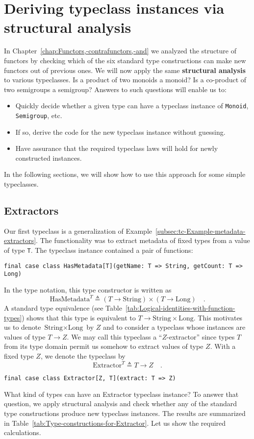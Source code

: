 \section{Deriving typeclass instances via structural analysis}

In Chapter~\ref{chap:Functors,-contrafunctors,-and} we analyzed
the structure of functors by checking which of the six standard type
constructions can make new functors out of previous ones. We will
now apply the same \textbf{structural
analysis} to various typeclasses. Is a product of two monoids a monoid?
Is a co-product of two semigroups a semigroup? Answers to such questions
will enable us to:
\begin{itemize}
\item Quickly decide whether a given type can have a typeclass instance
of \lstinline!Monoid!, \lstinline!Semigroup!, etc.
\item If so, derive the code for the new typeclass instance without guessing.
\item Have assurance that the required typeclass laws will hold for newly
constructed instances.
\end{itemize}
In the following sections, we will show how to use this approach for
some simple typeclasses.

\subsection{Extractors}

Our first typeclass is a generalization of Example~\ref{subsec:tc-Example-metadata-extractors}.
The functionality was to extract metadata of fixed types from a value
of type \lstinline!T!. The typeclass instance contained a pair of
functions:
\begin{lstlisting}
final case class HasMetadata[T](getName: T => String, getCount: T => Long)
\end{lstlisting}
In the type notation, this type constructor is written as
\[
\text{HasMetadata}^{T}\triangleq(T\rightarrow\text{String})\times(T\rightarrow\text{Long})\quad.
\]
A standard type equivalence (see Table~\ref{tab:Logical-identities-with-function-types})
shows that this type is equivalent to $T\rightarrow\text{String}\times\text{Long}$.
This motivates us to denote $\text{String}\times\text{Long}$ by $Z$
and to consider a typeclass whose instances are values of type $T\rightarrow Z$.
We may call this typeclass a \textsf{``}$Z$-extractor\textsf{''}
since types $T$ from its type domain permit us somehow to extract
values of type $Z$. With a fixed type $Z$, we denote the typeclass
by
\[
\text{Extractor}^{T}\triangleq T\rightarrow Z\quad.
\]
\begin{lstlisting}
final case class Extractor[Z, T](extract: T => Z)
\end{lstlisting}
What kind of types can have an Extractor typeclass instance? To answer
that question, we apply structural analysis and check whether any
of the standard type constructions produce new typeclass instances.
The results are summarized in Table~\ref{tab:Type-constructions-for-Extractor}.
Let us show the required calculations.

